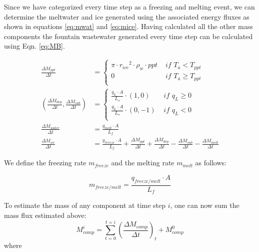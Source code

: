 \documentclass[utf8]{frontiersSCNS} %
\begin{document}
Since we have categorized every time step as a freezing and melting event, we can determine the meltwater and  ice
generated using the associated energy fluxes as shown in equations \ref{eq:mwat} and \ref{eq:mice}. Having
calculated all the other mass components the fountain wastewater generated every time step can be calculated using
Eqn. \ref{eq:MB}.

\begin{subequations}
	\label{equations}
	\begin{align}
		\label{eq:ppt}
		\frac{\Delta M_{ppt}}{\Delta t}                                    & = \left\{ \begin{array}{ll} \pi \cdot {r_{ice}}^2 \cdot
			\rho_{w}\cdot ppt & \textit{ if } T_{a} < T_{ppt} \\ 0 & \textit{ if } T_{a} \geq T_{ppt} \\\end{array} \right.                                      \\
		\label{eq:vap}
		(\frac{\Delta M_{dep}}{\Delta t}, \frac{\Delta M_{sub}}{\Delta t}) & = \left\{ \begin{array}{ll} \frac{q_{L}
			\cdot A}{L_s}\cdot (1,0)  & \textit{ if } q_{L} \geq 0 \\ \frac{q_{L}
			\cdot A}{L_s}\cdot (0,-1) & \textit{ if } q_{L} < 0    \\\end{array} \right.                                      \\
		\label{eq:mwat}
		\frac{\Delta M_{water}}{\Delta t}                                  & = \frac{q_{melt} \cdot A }{L_f}                                                   \\
		\label{eq:mice}
		\frac{\Delta M_{ice}}{\Delta t}                                    & = \frac{q_{freeze}\cdot A }{L_f} + \frac{\Delta M_{ppt}}{\Delta t} + \frac{\Delta
			M_{dep}}{\Delta t}- \frac{\Delta M_{sub}}{\Delta t}- \frac{\Delta M_{melt}}{\Delta t}
	\end{align}
\end{subequations}

We define the freezing rate $m_{freeze}$ and the melting rate $m_{melt}$ as follows:

\begin{equation}
	m_{freeze/melt} = \frac{q_{freeze/melt} \cdot A }{L_f}
\end{equation}

To estimate the mass of any component at time step $i$, one can now sum the mass flux estimated above:
\begin{equation} M_{comp}^i = \sum_{t=0}^{t=i} (\frac{\Delta M_{comp}}{\Delta t})_{t} + M_{comp}^0 \end{equation}
where
\end{document}
